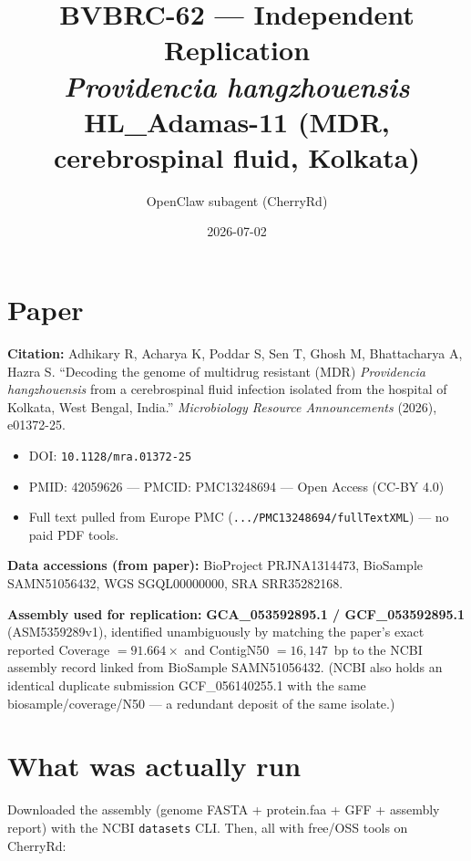 \documentclass[11pt]{article}
\title{BVBRC-62 --- Independent Replication\\
\large \textit{Providencia hangzhouensis} HL\_Adamas-11 (MDR, cerebrospinal fluid, Kolkata)}
\author{OpenClaw subagent (CherryRd)}
\date{2026-07-02}
\begin{document}
\maketitle

\section{Paper}

\textbf{Citation:} Adhikary R, Acharya K, Poddar S, Sen T, Ghosh M, Bhattacharya A, Hazra S.
``Decoding the genome of multidrug resistant (MDR) \textit{Providencia hangzhouensis} from a
cerebrospinal fluid infection isolated from the hospital of Kolkata, West Bengal, India.''
\textit{Microbiology Resource Announcements} (2026), e01372-25.

\begin{itemize}
  \item DOI: \texttt{10.1128/mra.01372-25}
  \item PMID: 42059626 --- PMCID: PMC13248694 --- Open Access (CC-BY 4.0)
  \item Full text pulled from Europe PMC (\texttt{.../PMC13248694/fullTextXML}) --- no paid PDF tools.
\end{itemize}

\textbf{Data accessions (from paper):} BioProject PRJNA1314473, BioSample SAMN51056432,
WGS SGQL00000000, SRA SRR35282168.

\textbf{Assembly used for replication:} \textbf{GCA\_053592895.1 / GCF\_053592895.1} (ASM5359289v1),
identified unambiguously by matching the paper's exact reported Coverage $= 91.664\times$ and
ContigN50 $= 16{,}147$~bp to the NCBI assembly record linked from BioSample SAMN51056432.
(NCBI also holds an identical duplicate submission GCF\_056140255.1 with the same
biosample/coverage/N50 --- a redundant deposit of the same isolate.)

\section{What was actually run}

Downloaded the assembly (genome FASTA + protein.faa + GFF + assembly report) with the NCBI
\texttt{datasets} CLI. Then, all with free/OSS tools on CherryRd:
\end{document}
